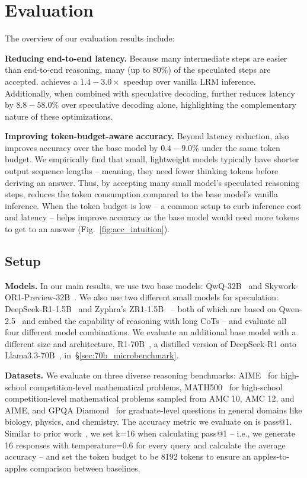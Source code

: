 \section{Evaluation}




The overview of our evaluation results include:

\squishlist
    \item \textbf{Reducing end-to-end latency.} Because many intermediate steps are easier than end-to-end reasoning, many (up to 80\%) of the speculated steps are accepted. \name{} achieves a $1.4-3.0\times$ speedup over vanilla LRM inference. Additionally, when combined with speculative decoding, \name{} further reduces latency by $8.8-58.0\%$ over speculative decoding alone, highlighting the complementary nature of these optimizations.
    \item \textbf{Improving token-budget-aware accuracy.} Beyond latency reduction, \name{} also improves accuracy over the base model by $0.4-9.0\%$ under the same token budget. We empirically find that small, lightweight models typically have shorter output sequence lengths -- meaning, they need fewer thinking tokens before deriving an answer. Thus, by accepting many small model's speculated reasoning steps, \name{} reduces the token consumption compared to the base model's vanilla inference. When the token budget is low -- a common setup to curb inference cost and latency -- \name{} helps improve accuracy as the base model would need more tokens to get to an answer (Fig.~\ref{fig:acc_intuition}).
\squishend

\subsection{Setup}

\textbf{Models.} In our main results, we use two base models: QwQ-32B~\citep{qwq_32b} and Skywork-OR1-Preview-32B~\citep{skywork_32b}. We also use two different small models for speculation: DeepSeek-R1-1.5B~\citep{deepseek_r1} and Zyphra's ZR1-1.5B~\citep{zyphra_1.5b} -- both of which are based on Qwen-2.5~\citep{qwen2.5} and embed the capability of reasoning with long CoTs -- and evaluate all four different model combinations. We evaluate an additional base model with a different size and architecture, R1-70B~\citep{deepseek_r1}, a distilled version of DeepSeek-R1 onto Llama3.3-70B~\citep{llama3}, in~\S\ref{sec:70b_microbenchmark}.

\textbf{Datasets.} We evaluate \name{} on three diverse reasoning benchmarks: AIME~\citep{aime} for high-school competition-level mathematical problems, MATH500~\citep{math500} for high-school competition-level mathematical problems sampled from AMC 10, AMC 12, and AIME, and GPQA Diamond~\citep{gpqa} for graduate-level questions in general domains like biology, physics, and chemistry. The accuracy metric we evaluate on is pass@1. Similar to prior work~\citep{deepseek_r1}, we set k=16 when calculating pass@1 -- i.e., we generate 16 responses with temperature=0.6 for every query and calculate the average accuracy -- and set the token budget to be 8192 tokens to ensure an apples-to-apples comparison between baselines.  %

